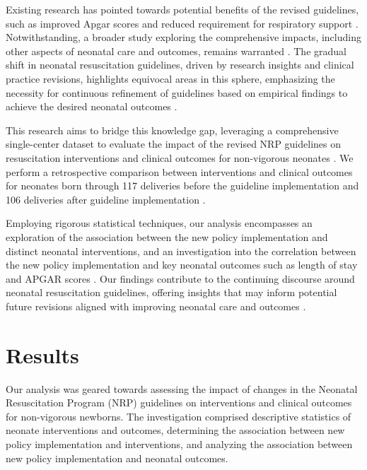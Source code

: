 \documentclass[11pt]{article}
\begin{document}
Existing research has pointed towards potential benefits of the revised guidelines, such as improved Apgar scores and reduced requirement for respiratory support \cite{Myers2020ImpactOT}. Notwithstanding, a broader study exploring the comprehensive impacts, including other aspects of neonatal care and outcomes, remains warranted \cite{Chiruvolu2018DeliveryRM}. The gradual shift in neonatal resuscitation guidelines, driven by research insights and clinical practice revisions, highlights equivocal areas in this sphere, emphasizing the necessity for continuous refinement of guidelines based on empirical findings to achieve the desired neonatal outcomes \cite{Kamath-Rayne2018HelpingBB, Study2018EpidemiologyCS}.

This research aims to bridge this knowledge gap, leveraging a comprehensive single-center dataset to evaluate the impact of the revised NRP guidelines on resuscitation interventions and clinical outcomes for non-vigorous neonates \cite{Mileder2021TelesimulationAA, Lindhard2021SimulationBasedNR}. We perform a retrospective comparison between interventions and clinical outcomes for neonates born through 117 deliveries before the guideline implementation and 106 deliveries after guideline implementation \cite{Okun2016NewbornSF, Chandrasekharan2020NeonatalRA}.

Employing rigorous statistical techniques, our analysis encompasses an exploration of the association between the new policy implementation and distinct neonatal interventions, and an investigation into the correlation between the new policy implementation and key neonatal outcomes such as length of stay and APGAR scores \cite{Jacobs2004CardiacAA, Rubertsson2014MechanicalCC}. Our findings contribute to the continuing discourse around neonatal resuscitation guidelines, offering insights that may inform potential future revisions aligned with improving neonatal care and outcomes \cite{Olasveengen2009IntravenousDA, Link2015Part7A}.

\section*{Results}

Our analysis was geared towards assessing the impact of changes in the Neonatal Resuscitation Program (NRP) guidelines on interventions and clinical outcomes for non-vigorous newborns. The investigation comprised descriptive statistics of neonate interventions and outcomes, determining the association between new policy implementation and interventions, and analyzing the association between new policy implementation and neonatal outcomes.
\end{document}
